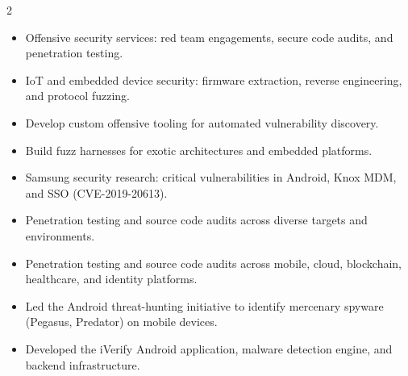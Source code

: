 \documentclass[10pt,a4paper,ragged2e,withhyper]{altacv}
\begin{document}
\begin{paracol}{2}

\begin{itemize}
\item Offensive security services: red team engagements, secure code audits, and penetration testing.
\item IoT and embedded device security: firmware extraction, reverse engineering, and protocol fuzzing.
\item Develop custom offensive tooling for automated vulnerability discovery.
\item Build fuzz harnesses for exotic architectures and embedded platforms.
\item Samsung security research: critical vulnerabilities in Android, Knox MDM, and SSO (CVE-2019-20613).
\end{itemize}

\divider
\vspace{0.5em}

\begin{itemize}
\item Penetration testing and source code audits across diverse targets and environments.
\end{itemize}

\divider
\vspace{0.5em}

\begin{itemize}
\item Penetration testing and source code audits across mobile, cloud, blockchain, healthcare, and identity platforms.
\end{itemize}

\divider
\vspace{0.5em}

\begin{itemize}
\item Led the Android threat-hunting initiative to identify mercenary spyware (Pegasus, Predator) on mobile devices.
\item Developed the iVerify Android application, malware detection engine, and backend infrastructure.
\end{itemize}


\end{paracol}
\end{document}
